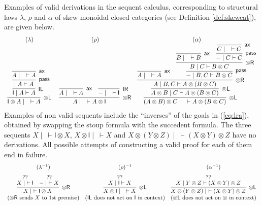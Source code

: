 \documentclass[submission,copyright,creativecommons]{eptcs}
\theoremstyle{definition}
\newcommand{\tl}{\otimes \mathsf{L}}
\newcommand{\tr}{\otimes \mathsf{R}}
\newcommand{\pass}{\mathsf{pass}}
\newcommand{\unitl}{\mathsf{IL}}
\newcommand{\unitr}{\mathsf{IR}}
\newcommand{\ax}{\mathsf{ax}}
\newcommand{\ot}{\otimes}
\newcommand{\I}{\mathsf{I}}
\begin{document}
Examples of valid derivations in the sequent calculus, corresponding to structural laws $\lambda$, $\rho$ and $\alpha$ of skew monoidal closed categories (see Definition \ref{def:skewcat}), are given below. %
\begin{equation}\label{eq:lra}
  \begin{array}{c@{\;\quad}cc}
  (\lambda) & (\rho) & (\alpha) \\
  \infer[\tl]{\I \ot A \mid \quad \vdash A}{
    \infer[\unitl]{\I \mid A \vdash A}{
      \infer[\pass]{ \mid A \vdash A}{
        \infer[\ax]{A \mid \quad \vdash A}{}
      }
    }
  }
  &
  \infer[\tr]{A \mid \quad \vdash A \ot \I}{
    \infer[\ax]{A \mid \quad \vdash A}{}
    &
    \infer[\unitr]{- \mid \quad \vdash \I}{}
  }
  &
  \infer[\tl]{(A \ot B) \ot C \mid \quad \vdash A \ot (B \ot C)}{
    \infer[\tl]{A \ot B \mid C \vdash A \ot (B \ot C)}{
      \infer[\tr]{A \mid B , C \vdash A \ot (B \ot C)}{
        \infer[\ax]{A \mid \quad \vdash A}{}
        &
        \infer[\pass]{- \mid B , C \vdash B \ot C}{
          \infer[\tr]{B \mid C \vdash B \ot C}{
            \infer[\ax]{B \mid \quad \vdash B}{}
            &
            \infer[\pass]{- \mid C \vdash C}{
              \infer[\ax]{C \mid \quad \vdash C}{}
            }
          }
        }
      }
    }
  }
  \end{array}
\end{equation}
Examples of non valid sequents include the ``inverses'' of the goals in (\ref{eq:lra}), obtained by swapping the stoup formula with the succedent formula. 
The three sequents $X \mid ~ \vdash \I \ot X$, $X \ot \I \mid ~ \vdash X$ and $X \ot (Y \ot Z) \mid ~ \vdash (X \ot Y) \ot Z$ have no derivations. All possible attempts of constructing a valid proof for each of them end in failure.
\begin{displaymath}
  \begin{array}{ccc}
  (\lambda^{-1}) & (\rho)^{-1} & (\alpha^{-1}) \\[6pt]
    \infer[\tr]{X \mid ~\vdash \I \ot X}{
      \deduce[??]{X \mid ~ \vdash \I}{
      }
      &
      \deduce[??]{- \mid ~ \vdash X}{
      }
    }
    &
    \infer[\tl]{X \ot \I \mid \quad \vdash X}{
      \deduce{X \mid \I \vdash X}{??}
    }
    &
    \infer[\tl]{X \ot (Y \ot Z) \mid ~\vdash (X \ot Y) \ot Z}{
      \deduce{X \mid Y \ot Z \vdash (X \ot Y) \ot Z}{??}
    } \\
    (\text{$\tr$ sends $X$ to 1st premise}) &
    (\text{$\unitl$ does not act on $\I$ in context}) &
    (\text{$\tl$ does not act on $\ot$ in context})
  \end{array}
\end{displaymath}
\end{document}
